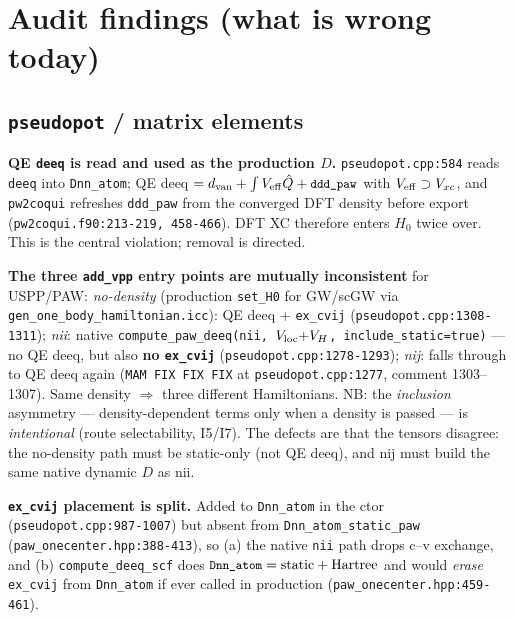 \documentclass[11pt]{article}
\newcommand{\code}[1]{\texttt{\small #1}}
\newcommand{\file}[1]{\texttt{\small #1}}
\newcommand{\Qhat}{\hat{Q}}
\begin{document}
\section{Audit findings (what is wrong today)}
\label{sec:findings}

\subsection{\code{pseudopot} / matrix elements}

\begin{description}[leftmargin=2.6em,style=nextline]
\item[F1.] \textbf{QE \code{deeq} is read and used as the production $D$.}
\code{pseudopot.cpp:584} reads \code{deeq} into \code{Dnn\_atom}; QE deeq
$= d_{\rm van} + \int V_{\rm eff}\Qhat + \code{ddd\_paw}$ with
$V_{\rm eff} \supset V_{xc}$, and \code{pw2coqui} refreshes \code{ddd\_paw}
from the converged DFT density before export
(\file{pw2coqui.f90:213-219, 458-466}). DFT XC therefore enters $H_0$ twice
over. This is the central violation; removal is directed.

\item[F2.] \textbf{The three \code{add\_vpp} entry points are mutually
inconsistent} for USPP/PAW:
\emph{no-density} (production \code{set\_H0} for GW/scGW via
\file{gen\_one\_body\_hamiltonian.icc}): QE deeq + \code{ex\_cvij}
(\code{pseudopot.cpp:1308-1311});
\emph{nii}: native \code{compute\_paw\_deeq(nii, $V_{\rm loc}{+}V_H$,
include\_static=true)} --- no QE deeq, but also \textbf{no \code{ex\_cvij}}
(\code{pseudopot.cpp:1278-1293});
\emph{nij}: falls through to QE deeq again (\code{MAM FIX FIX FIX} at
\code{pseudopot.cpp:1277}, comment 1303--1307).
Same density $\Rightarrow$ three different Hamiltonians.
NB: the \emph{inclusion} asymmetry --- density-dependent terms only when a
density is passed --- is \emph{intentional} (route selectability, I5/I7).
The defects are that the tensors disagree: the no-density path must be
static-only (not QE deeq), and nij must build the same native dynamic $D$
as nii.

\item[F3.] \textbf{\code{ex\_cvij} placement is split.} Added to
\code{Dnn\_atom} in the ctor (\code{pseudopot.cpp:987-1007}) but absent from
\code{Dnn\_atom\_static\_paw} (\file{paw\_onecenter.hpp:388-413}), so (a) the
native \code{nii} path drops c--v exchange, and (b) \code{compute\_deeq\_scf}
does $\code{Dnn\_atom} = \text{static} + \text{Hartree}$ and would
\emph{erase} \code{ex\_cvij} from \code{Dnn\_atom} if ever called in
production (\file{paw\_onecenter.hpp:459-461}).


\end{description}
\end{document}
